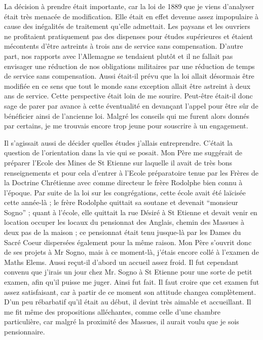 \documentclass[11pt,a4paper]{report}
\begin{document}
La décision à prendre était importante, car la loi de 1889 que je viens d'analyser était très menacée de modification. Elle était en effet devenue assez impopulaire à cause des inégalités de traitement qu'elle admettait. Les paysans et les ouvriers ne profitaient pratiquement pas des dispenses pour études supérieures et étaient mécontents d'être astreints à trois ans de service sans compensation. D'autre part, nos rapports avec l'Allemagne se tendaient plutôt et il ne fallait pas envisager une réduction de nos obligations militaires par une réduction de temps de service sans compensation. Aussi était-il prévu que la loi allait désormais être modifiée en ce sens que tout le monde sans exception allait être astreint à deux ans de service. Cette perspective était loin de me sourire. Peut-être était-il donc sage de parer par avance à cette éventualité en devançant l'appel pour être sûr de bénéficier ainsi de l'ancienne loi. Malgré les conseils qui me furent alors donnés par certains, je me trouvais encore trop jeune pour souscrire à un engagement.

Il s'agissait aussi de décider quelles études j'allais entreprendre. C'était la question de l'orientation dans la vie qui se posait. Mon Père me suggérait de préparer l'Ecole des Mines de St Etienne sur laquelle il avait de très bons renseignements et pour cela d'entrer à l'Ecole préparatoire tenue par les Frères de la Doctrine Chrétienne avec comme directeur le frère Rodolphe bien connu à l'époque. Par suite de la loi sur les congrégations, cette école avait été laïcisée cette année-là ; le frère Rodolphe quittait sa soutane et devenait ``monsieur Sogno'' ; quant à l'école, elle quittait la rue Désiré à St Etienne et devait venir en location occuper les locaux du pensionnat des Anglais, chemin des Massues à deux pas de la maison ; ce pensionnat était tenu jusque-là par les Dames du Sacré Coeur dispersées également pour la même raison. Mon Père s'ouvrit donc de ses projets à Mr Sogno, mais à ce moment-là, j'étais encore collé à l'examen de Maths Elems. Aussi reçut-il d'abord un accueil assez froid. Il fut cependant convenu que j'irais un jour chez Mr. Sogno à St Etienne pour une sorte de petit examen, afin qu'il puisse me juger. Ainsi fut fait. Il faut croire que cet examen fut assez satisfaisant, car à partir de ce moment son attitude changea complètement. D'un peu rébarbatif qu'il était au début, il devint très aimable et accueillant. Il me fit même des propositions alléchantes, comme celle d'une chambre particulière, car malgré la proximité des Massues, il aurait voulu que je sois pensionnaire.
\end{document}
